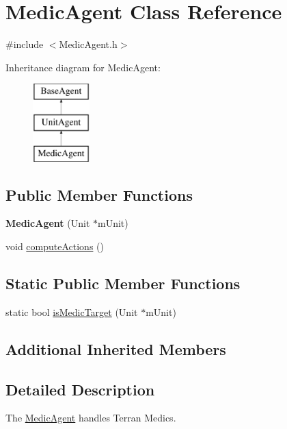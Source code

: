 \hypertarget{class_medic_agent}{\section{Medic\-Agent Class Reference}
\label{class_medic_agent}
}


{\ttfamily \#include $<$Medic\-Agent.\-h$>$}

Inheritance diagram for Medic\-Agent\-:\begin{figure}[H]
\begin{center}
\leavevmode
\includegraphics[height=3.000000cm]{class_medic_agent}
\end{center}
\end{figure}
\subsection*{Public Member Functions}
\begin{DoxyCompactItemize}
\item 
\hypertarget{class_medic_agent_a6c505e60bad98467a54c8125034849b6}{{\bfseries Medic\-Agent} (Unit $\ast$m\-Unit)}\label{class_medic_agent_a6c505e60bad98467a54c8125034849b6}

\item 
void \hyperlink{class_medic_agent_a2d7e2fe20f5aa2504418022267326582}{compute\-Actions} ()
\end{DoxyCompactItemize}
\subsection*{Static Public Member Functions}
\begin{DoxyCompactItemize}
\item 
static bool \hyperlink{class_medic_agent_a13cb6bff4f6ecb5b7e88bfb8d23ff445}{is\-Medic\-Target} (Unit $\ast$m\-Unit)
\end{DoxyCompactItemize}
\subsection*{Additional Inherited Members}


\subsection{Detailed Description}
The \hyperlink{class_medic_agent}{Medic\-Agent} handles Terran Medics.

